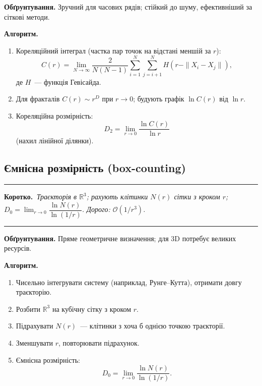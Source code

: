 \documentclass[12pt,a4paper]{article}
\newenvironment{korotko}
  {\par\medskip\noindent\begingroup\color{accent!75!black}\rule{\linewidth}{0.4pt}\par
   \noindent\textbf{Коротко.}\itshape\,}
  {\par\noindent\rule{\linewidth}{0.4pt}\endgroup\medskip}
\begin{document}
\textbf{Обґрунтування.} Зручний для часових рядів; стійкий до шуму, ефективніший за
сіткові методи.

\textbf{Алгоритм.}
\begin{enumerate}[leftmargin=1.6em,itemsep=0.25em]
  \item Кореляційний інтеграл (частка пар точок на відстані меншій за $r$):
        \[
          C(r)=\lim_{N\to\infty}\frac{2}{N(N-1)}
          \sum_{i=1}^{N}\sum_{j=i+1}^{N}H(r-\|X_i-X_j\|),
        \]
        де $H$~--- функція Гевісайда.
  \item Для фракталів $C(r)\sim r^D$ при $r\to0$; будують графік $\ln C(r)$ від $\ln r$.
  \item Кореляційна розмірність:
        \[
          D_2=\lim_{r\to0}\frac{\ln C(r)}{\ln r}
        \]
        (нахил лінійної ділянки).
\end{enumerate}

\subsection{Ємнісна розмірність (box-counting)}

\begin{korotko}
Траєкторія в $\mathbb{R}^3$; рахують клітинки $N(r)$ сітки з кроком $r$;
$D_0=\lim_{r\to0}\dfrac{\ln N(r)}{\ln(1/r)}$. Дорого: $\mathcal{O}(1/r^3)$.
\end{korotko}

\textbf{Обґрунтування.} Пряме геометричне визначення; для 3D потребує великих ресурсів.

\textbf{Алгоритм.}
\begin{enumerate}[leftmargin=1.6em,itemsep=0.25em]
  \item Чисельно інтегрувати систему (наприклад, Рунге--Кутта), отримати довгу траєкторію.
  \item Розбити $\mathbb{R}^3$ на кубічну сітку з кроком $r$.
  \item Підрахувати $N(r)$~--- клітинки з хоча б однією точкою траєкторії.
  \item Зменшувати $r$, повторювати підрахунок.
  \item Ємнісна розмірність:
        \[
          D_0=\lim_{r\to0}\frac{\ln N(r)}{\ln(1/r)}.
        \]
\end{enumerate}
\end{document}
